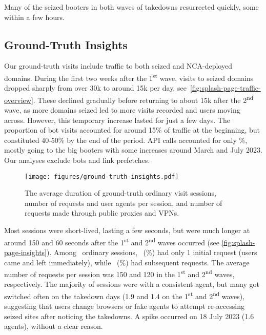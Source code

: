\documentclass[letterpaper,twocolumn,10pt]{article}
\begin{document}
 Many of the seized booters in both waves of takedowns resurrected quickly, some within a few hours.

\subsection{Ground-Truth Insights} \label{sec:ground-truth-insights}
Our ground-truth visits include traffic to both seized and NCA-deployed domains. During the first two weeks after the 1\textsuperscript{st} wave, visits to seized domains dropped sharply from over 30k to around 15k per day, see~\autoref{fig:splash-page-traffic-overview}. These declined gradually before returning to about 15k after the 2\textsuperscript{nd} wave, as more domains seized led to more visits recorded and users moving across. However, this temporary increase lasted for just a few days. The proportion of bot visits accounted for around 15\% of traffic at the beginning, but constituted 40-50\% by the end of the period. API calls accounted for only \BTnapicallVisitsProps\%, mostly going to the big booters with some increases around March and July 2023. Our analyses exclude bots and link prefetches.

\begin{figure}[t]
    \centering
    \texttt{[image: figures/ground-truth-insights.pdf]}\\
    \caption{The average duration of ground-truth ordinary visit sessions, number of requests and user agents per session, and number of requests made through public proxies and VPNs.}
    \label{fig:splash-page-insights}
\end{figure}
 Most sessions were short-lived, lasting a few seconds, but were much longer at around 150 and 60 seconds after the 1\textsuperscript{st} and 2\textsuperscript{nd} waves occurred (see \autoref{fig:splash-page-insights}). Among \BTnrealvisitVisits~ordinary sessions, \BTnGroundTruthSessionsWithSingleRequest~(\BTnGroundTruthSessionsWithSingleRequestProps\%) had only 1 initial request (users came and left immediately), while \BTnGroundTruthSessionsWithMultipleRequests~(\BTnGroundTruthSessionsWithMultipleRequestsProps\%) had subsequent requests. The average number of requests per session was 150 and 120 in the 1\textsuperscript{st} and 2\textsuperscript{nd} waves, respectively. The majority of sessions were with a consistent agent, but many got switched often on the takedown days (1.9 and 1.4 on the 1\textsuperscript{st} and 2\textsuperscript{nd} waves), suggesting that users change browsers or fake agents to attempt re-accessing seized sites after noticing the takedowns. A spike occurred on 18 July 2023 (1.6 agents), without a clear reason.
\end{document}
